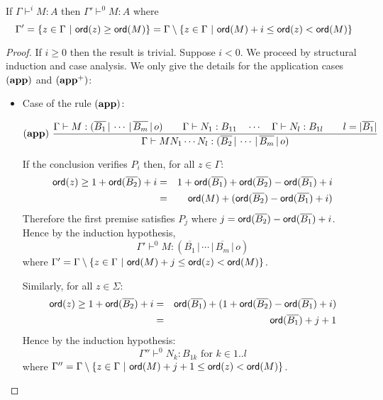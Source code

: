 \begin{lem}
\label{lem:restriction}

If $\Gamma \vdash^i M : A$ then $\Gamma' \vdash^{0} M : A$
where $$\Gamma' = \{ z \in \Gamma \ |
\ \ord{z} \geq \ord{M} \} = \Gamma \setminus \{ z \in \Gamma \ | \ \ord{M} + i \leq \ord{z} < \ord{M} \}$$
\end{lem}
\begin{proof}
If $i\geq 0$ then the result is trivial. Suppose $i<0$. We proceed
by structural induction and case analysis. We only give the details
for the application cases $\mathbf{(app)}$ and $\mathbf{(app^+)}$:
\begin{itemize}
\item Case of the rule $\mathbf{(app)}$:

    \[ (\mathbf{app}) \
    \frac{\displaystyle {{\Gamma} \vdash {M : (\overline{B_1} \, | \, \cdots \, | \, \overline{B_m} \, | \, o)}} \qquad
            {{\Gamma} \vdash {N_1 : B_{11}}} \quad \cdots \quad {{\Gamma} \vdash {N_{l} :
            B_{1l}}} \qquad l = |\overline{B_1}| }{ {{\Gamma} \vdash {M N_1
            \cdots N_{l} : (\overline{B_2} \, | \, \cdots \, | \,
            \overline{B_m} \, | \, o)}}}
    \]

    If the conclusion verifies $P_i$ then, for all $z \in \Gamma$:
    \begin{eqnarray*}
    {\sf ord}(z) \geq 1 + {\sf ord}(\overline{B_2}) + i
    &=& 1 + {\sf ord}(\overline{B_1}) + {\sf ord}(\overline{B_2}) - {\sf ord}(\overline{B_1}) + i \\
    &=& {\sf ord}(M) + ({\sf ord}(\overline{B_2}) - {\sf ord}(\overline{B_1}) + i)
    \end{eqnarray*}
    Therefore the first premise satisfies $P_j$ where $j={{\sf ord}(\overline{B_2}) - {\sf ord}(\overline{B_1}) + i}$.
    Hence by the induction hypothesis,
    $$\Gamma' \vdash^{0} M : (\overline{B_1} \, | \, \cdots \, | \, \overline{B_m} \, | \, o)$$
    where $\Gamma' = \Gamma \setminus \{ z \in \Gamma \ | \ {\sf ord}(M) + j \leq {\sf ord}(z) < {\sf ord}(M) \}$.


    Similarly, for all $z \in \Sigma$:
    \begin{eqnarray*}
    {\sf ord}(z) \geq 1 + {\sf ord}(\overline{B_2}) + i
    &=& {\sf ord}(\overline{B_1}) + (1+{\sf ord}(\overline{B_2}) - {\sf ord}(\overline{B_1}) + i) \\
    &=& {\sf ord}(\overline{B_1}) + j+1
    \end{eqnarray*}
    Hence by the induction hypothesis:
    $$\Gamma'' \vdash^0 N_k : B_{1k} \mbox{ for } k \in 1..l$$
    where $\Gamma'' = \Gamma \setminus \{ z \in \Gamma \ | \ {\sf ord}(M) + j+1 \leq {\sf ord}(z) < {\sf ord}(M) \}$.


\end{itemize}
\end{proof}
